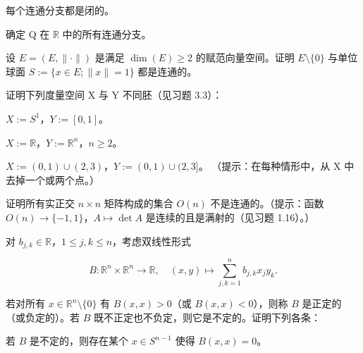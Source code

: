 \begin{exercises}
\begin{items}
每个连通分支都是闭的。

\end{items}

\item

确定 Q 在 $ \mathbb{R} $ 中的所有连通分支。

\item

设 $ E = (E, \|\cdot\|) $ 是满足 $ \dim(E) \geq 2 $ 的赋范向量空间。证明 $ E \setminus \{0\} $ 与单位球面 $ S := \{x \in E; \|x\| = 1\} $ 都是连通的。

\item

证明下列度量空间 X 与 Y 不同胚（见习题 3.3）：

\begin{items}
\item

$ X := S^{1} $，$ Y := [0, 1] $。

\item

$ X := \mathbb{R} $，$ Y := \mathbb{R}^n $，$ n \geq 2 $。

\item

$ X := (0,1) \cup (2,3) $，$ Y := (0,1) \cup (2,3] $。
（提示：在每种情形中，从 X 中去掉一个或两个点。）

\end{items}

\item

证明所有实正交 $ n \times n $ 矩阵构成的集合 $ O(n) $ 不是连通的。（提示：函数 $ O(n) \to \{-1,1\} $，$ A \mapsto \det A $ 是连续的且是满射的（见习题 1.16）。）

\item

对 $ b_{j,k} \in \mathbb{R} $，$ 1 \leq j, k \leq n $，考虑双线性形式

\[
B:\mathbb{R}^{n}\times\mathbb{R}^{n}\to\mathbb{R},\quad(x,y)\mapsto\sum_{j,k=1}^{n}b_{j,k}x_{j}y_{k}.
\]

若对所有 $x \in \mathbb{R}^n \setminus \{0\}$ 有 $B(x,x) > 0$（或 $B(x,x) < 0$），则称 $B$ 是正定的（或负定的）。若 $B$ 既不正定也不负定，则它是不定的。证明下列各条：

\begin{items}
\item

若 $B$ 是不定的，则存在某个 $x \in S^{n-1}$ 使得 $B(x,x) = 0$。


\end{items}
\end{exercises}
